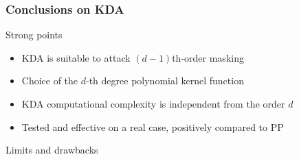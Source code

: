 \begin{frame}
\frametitle{Conclusions on KDA}
\begin{block}{Strong points}
\begin{itemize}
\item KDA is suitable to attack $(d-1)$th-order masking
\item Choice of the $d$-th degree polynomial kernel function
\item KDA computational complexity is independent from the order $d$
\item Tested and effective on a real case, positively compared to PP 
\end{itemize}
\end{block}

\begin{block}{Limits and drawbacks}
\end{block}



\end{frame}
